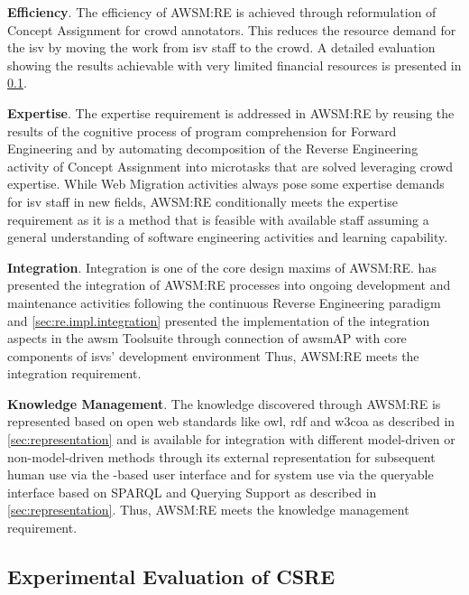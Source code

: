\textbf{Efficiency}. The efficiency of AWSM:RE is achieved through reformulation of \gls{Concept Assignment} for crowd annotators.
This reduces the resource demand for the \gls{isv} by moving the work from \gls{isv} staff to the crowd.
A detailed evaluation showing the results achievable with very limited financial resources is presented in \cref{sec:csre.experiment}.

\textbf{Expertise}. The expertise requirement is addressed in AWSM:RE by reusing the results of the cognitive process of program comprehension for \gls{Forward Engineering} and by automating decomposition of the \gls{Reverse Engineering} activity of \gls{Concept Assignment} into microtasks that are solved leveraging crowd expertise.
While \gls{Web Migration} activities always pose some expertise demands for \gls{isv} staff in new fields, AWSM:RE conditionally meets the expertise requirement as it is a method that is feasible with available staff assuming a general understanding of software engineering activities and learning capability.

\textbf{Integration}. Integration is one of the core design maxims of AWSM:RE.
 has presented the integration of AWSM:RE processes into ongoing development and maintenance activities following the continuous \gls{Reverse Engineering} paradigm and \cref{sec:re.impl.integration} presented the implementation of the integration aspects in the \gls{awsm} Toolsuite through connection of \gls{awsm}AP with core components of \glspl{isv}' development environment Thus, AWSM:RE meets the integration requirement.

\textbf{Knowledge Management}. The knowledge discovered through AWSM:RE is represented based on open \gls{web} standards like \gls{owl}, \gls{rdf} and \gls{w3c}{oa} as described in \cref{sec:representation} and is available for integration with different model-driven or non-model-driven methods through its external representation for subsequent human use via the -based user interface and for system use via the queryable interface based on SPARQL and Querying Support as described in \cref{sec:representation}.
Thus, AWSM:RE meets the knowledge management requirement.

\vspace{-15pt}
\hypertarget{sec:csre.experiment}{%
\subsection{Experimental Evaluation of CSRE}\label{sec:csre.experiment}}
\vspace{10pt}


